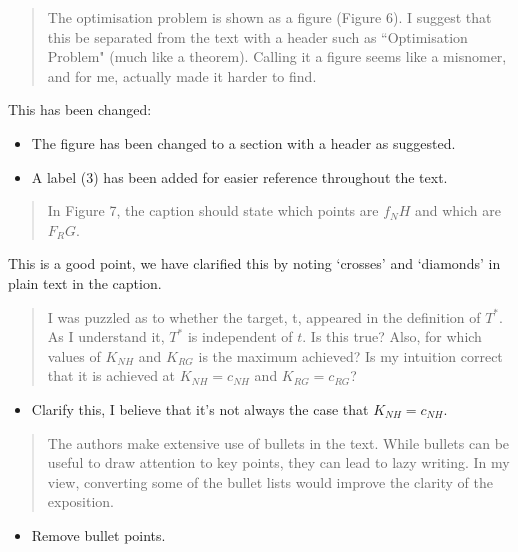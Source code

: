 \documentclass{article}
\begin{document}
\begin{quote}
    \begin{textit}
        {
        The optimisation problem is shown as a figure (Figure 6). I suggest
        that this be separated from the text with a header such as
        ``Optimisation Problem" (much like a theorem).  Calling it a figure
        seems like a misnomer, and for me, actually made it harder to find.
        }
    \end{textit}
\end{quote}

This has been changed:

\begin{itemize}
    \item The figure has been changed to a section with a header as suggested.
    \item A label (3) has been added for easier reference throughout the text.
\end{itemize}

\begin{quote}
    \begin{textit}
        {
        In Figure 7, the caption should state which points are \(f_NH\) and
        which are \(F_RG\).
        }
    \end{textit}
\end{quote}

This is a good point, we have clarified this by noting `crosses' and `diamonds' in plain text in the caption.

\begin{quote}
    \begin{textit}
        {
I was puzzled as to whether the target, t, appeared in the definition
of \(T^*\). As I understand it, \(T^*\) is independent of \(t\). Is this true?
Also, for which values of \(K_{NH}\) and \(K_{RG}\) is the maximum achieved? Is my
intuition correct that it is achieved at \(K_{NH} = c_{NH}\) and \(K_{RG} = c_{RG}\)?
        }
    \end{textit}
\end{quote}

\begin{itemize}
    \item Clarify this, I believe that it's not always the case that \(K_{NH}=c_{NH}\).
\end{itemize}

\begin{quote}
    \begin{textit}
        {
The authors make extensive use of bullets in the text. While bullets
can be useful to draw attention to key points, they can lead to lazy
writing. In my view, converting some of the bullet lists would improve
the clarity of the exposition.
        }
    \end{textit}
\end{quote}

\begin{itemize}
    \item Remove bullet points.
\end{itemize}
\end{document}

